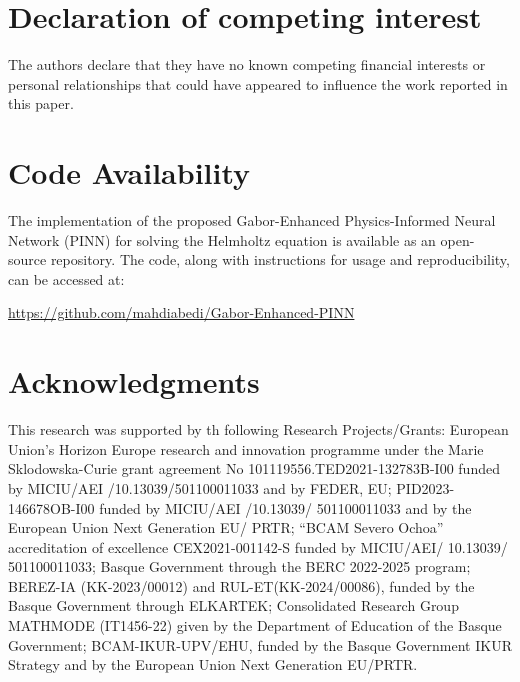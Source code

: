 \documentclass[authoryear, preprint, 12pt]{elsarticle}
\begin{document}
\section*{Declaration of competing interest}
The authors declare that they have no known competing financial interests or personal relationships that could have appeared to influence the work reported in this paper.

\section*{Code Availability}  
The implementation of the proposed Gabor-Enhanced Physics-Informed Neural Network (PINN) for solving the Helmholtz equation is available as an open-source repository. The code, along with instructions for usage and reproducibility, can be accessed at:  
\begin{center}
	\url{https://github.com/mahdiabedi/Gabor-Enhanced-PINN}
\end{center}  

\section*{Acknowledgments}
This research was supported by th following Research Projects/Grants: European Union’s Horizon Europe research and innovation programme under the Marie Sklodowska-Curie grant agreement No 101119556.TED2021-132783B-I00 funded by MICIU/AEI /10.13039/501100011033 and by FEDER, EU; PID2023-146678OB-I00 funded by MICIU/AEI /10.13039/ 501100011033 and by the European Union Next Generation EU/ PRTR; “BCAM Severo Ochoa” accreditation of excellence CEX2021-001142-S funded by MICIU/AEI/ 10.13039/ 501100011033; Basque Government through the BERC 2022-2025 program; BEREZ-IA (KK-2023/00012) and RUL-ET(KK-2024/00086), funded by the Basque Government through ELKARTEK; Consolidated Research Group MATHMODE (IT1456-22) given by the Department of Education of the Basque Government; BCAM-IKUR-UPV/EHU, funded by the Basque Government IKUR Strategy and by the European Union Next Generation EU/PRTR. 
\end{document}
